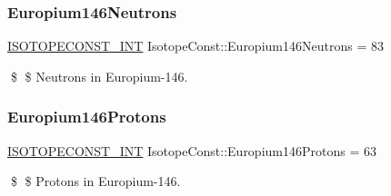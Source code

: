 \subsubsection{\texorpdfstring{Europium146\+Neutrons}{Europium146Neutrons}}
{\footnotesize\ttfamily \mbox{\hyperlink{group___isotope_const-_macros_ga5f18360b3e99483a35c32d789e62621c}{I\+S\+O\+T\+O\+P\+E\+C\+O\+N\+S\+T\+\_\+\+I\+NT}} Isotope\+Const\+::\+Europium146\+Neutrons = 83}

\$ \$ Neutrons in Europium-\/146. \mbox{\label{group___isotope_const-_europium-_eu146_gaa3fa954899cf7040882bedcdfab93d7a}} 
\subsubsection{\texorpdfstring{Europium146\+Protons}{Europium146Protons}}
{\footnotesize\ttfamily \mbox{\hyperlink{group___isotope_const-_macros_ga5f18360b3e99483a35c32d789e62621c}{I\+S\+O\+T\+O\+P\+E\+C\+O\+N\+S\+T\+\_\+\+I\+NT}} Isotope\+Const\+::\+Europium146\+Protons = 63}

\$ \$ Protons in Europium-\/146. 
